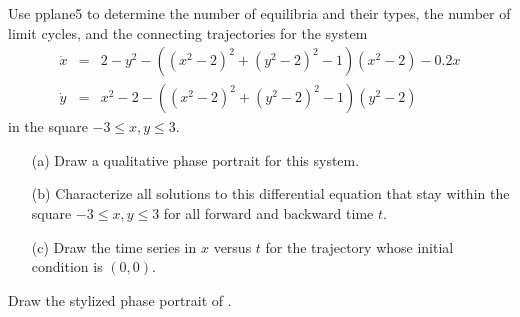 \documentclass{ximera}
\begin{document}
\begin{exercise} \label{c8.4.3}
Use {\sf pplane5} to determine the number of equilibria and their types, the
number of limit cycles, and the connecting trajectories for the system
\begin{equation*}
\begin{array}{rcl}
\dot{x} & = & 2-y^2-((x^2-2)^2+(y^2-2)^2-1)(x^2-2)-0.2x  \\
\dot{y} & = & x^2-2-((x^2-2)^2+(y^2-2)^2-1)(y^2-2)
\end{array}
\end{equation*}
in the square $-3 \leq x,y \leq 3$.   
\begin{itemize}
\item[(a)] Draw a qualitative phase portrait for this system.  
\item[(b)] Characterize all solutions to this differential equation that 
stay within the square $-3 \leq x,y \leq 3$ for all forward and backward time 
$t$.
\item[(c)] Draw the time series in $x$ versus $t$ for the trajectory whose
initial condition is $(0,0)$.
\end{itemize}
\end{exercise}  

\begin{exercise} \label{c8.4.4}
Draw the stylized phase portrait of .
\end{exercise}
\end{document}
